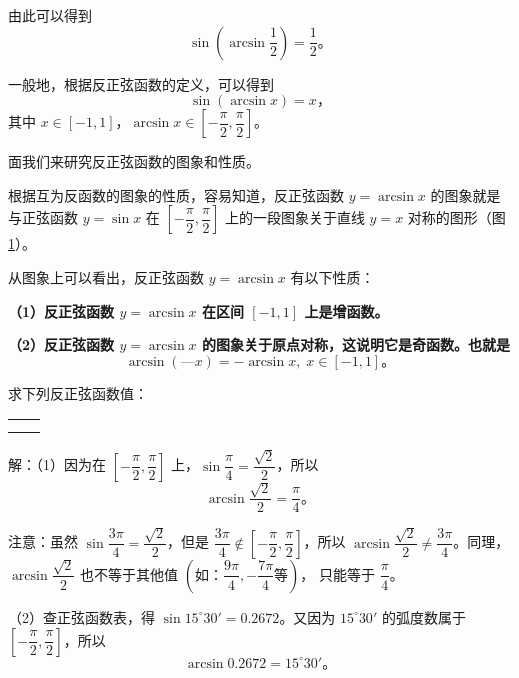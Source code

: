 由此可以得到
$$\sin\left( \arcsin \dfrac{1}{2} \right) = \dfrac{1}{2} \text{。}$$

一般地，根据反正弦函数的定义，可以得到
$$\sin(\arcsin x) = x \text{，}$$
其中 $x \in [-1, 1]$，$\arcsin x \in \left[ -\dfrac{\pi}{2}, \dfrac{\pi}{2} \right]$。

面我们来研究反正弦函数的图象和性质。

根据互为反函数的图象的性质，容易知道，反正弦函数 $y = \arcsin x$ 的图象就是与正弦函数 $y = \sin x$
在 $\left[ -\dfrac{\pi}{2}, \dfrac{\pi}{2} \right]$ 上的一段图象关于直线 $y = x$ 对称的图形（图\ref{fig:1-3}）。

\begin{figure}[htbp]
    \centering
    
    \caption{}\label{fig:1-3}
\end{figure}

从图象上可以看出，反正弦函数 $y = \arcsin x$ 有以下性质：

\textbf{（1）反正弦函数 $y = \arcsin x$ 在区间 $[-1, 1]$ 上是增函数。}

\textbf{（2）反正弦函数 $y = \arcsin x$ 的图象关于原点对称，这说明它是奇函数。也就是
$$\arcsin(—x) = -\arcsin x, \; x \in [-1, 1] \text{。}$$}

\liti 求下列反正弦函数值：
\begin{xiaoxiaotis}

    \renewcommand\arraystretch{1.8}
    \begin{tabular}[t]{*{2}{@{}p{16em}}}
         &  \\
         & 
    \end{tabular}

\end{xiaoxiaotis}

解：（1）因为在 $\left[ -\dfrac{\pi}{2}, \dfrac{\pi}{2} \right]$ 上，$\sin\dfrac{\pi}{4} = \dfrac{\sqrt{2}}{2}$，所以
$$\arcsin \dfrac{\sqrt{2}}{2} = \dfrac{\pi}{4} \text{。}$$

注意：虽然 $\sin\dfrac{3\pi}{4} = \dfrac{\sqrt{2}}{2}$，但是
$\dfrac{3\pi}{4} \notin \left[ -\dfrac{\pi}{2}, \dfrac{\pi}{2} \right]$，所以
$\arcsin \dfrac{\sqrt{2}}{2} \neq \dfrac{3\pi}{4}$。同理，
$\arcsin \dfrac{\sqrt{2}}{2}$ 也不等于其他值
$\left( \text{如：}\dfrac{9\pi}{4}, -\dfrac{7\pi}{4} \text{等} \right)$，
只能等于 $\dfrac{\pi}{4}$。

（2）查正弦函数表，得 $\sin15^\circ30' = 0.2672$。又因为 $15^\circ30'$ 的弧度数属于
$\left[ -\dfrac{\pi}{2}, \dfrac{\pi}{2} \right]$，所以
$$\arcsin 0.2672 = 15^\circ30' \text{。}$$


